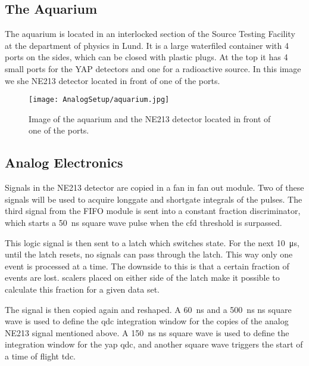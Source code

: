 \documentclass[main.tex]{subfiles}
\begin{document}


\subsection{The Aquarium}
The aquarium is located in an interlocked section of the Source Testing Facility at the department of physics in Lund. It is a large waterfiled container with 4 ports on the sides, which can be closed with plastic plugs. 
At the top it has 4 small ports for the YAP detectors and one for a radioactive source. In this image we she NE213 detector located in front of one of the ports.


\begin{figure}[ht]
	\centering
    	\texttt{[image: AnalogSetup/aquarium.jpg]}
        \caption{Image of the aquarium and the NE213 detector located in front of one of the ports.}
	    \label{fig:aquarium} 
\end{figure}
\newpage

\subsection{Analog Electronics}
Signals in the NE213 detector are copied in a fan in fan out module. Two of these signals will be used to acquire longgate and shortgate integrals of the pulses. The third signal from the FIFO module is sent into a constant fraction discriminator, which starts a \SI{50}{\nano\second} square wave pulse when the cfd threshold is surpassed. 

This logic signal is then sent to a latch which switches state. For the next \SI{10}{\micro\second}, until the latch resets, no signals can pass through the latch. This way only one event is processed at a time. The downside to this is that a certain fraction of events are lost. scalers placed on either side of the latch make it possible to calculate this fraction for a given data set.

The signal is then copied again and reshaped. A \SI{60}{\nano\second} and a \SI{500}{\nano\second} ns square wave is used to define the qdc integration window for the copies of the analog NE213 signal mentioned above. A \SI{150}{\nano\second} ns square wave is used to define the integration window for the yap qdc, and another square wave triggers the start of a time of flight tdc.
\end{document}
